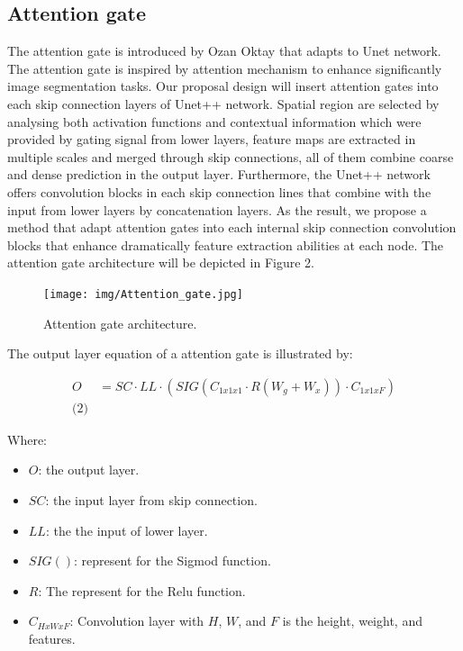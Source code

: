 \documentclass[journal]{IEEEtran} %
\begin{document}
\subsection{Attention gate}
The attention gate is introduced by Ozan Oktay \cite{b3} that adapts to Unet network. The attention gate is inspired by attention mechanism \cite{b4} to enhance significantly image segmentation tasks. Our proposal design will insert attention gates into each skip connection layers of Unet++ network. Spatial region are selected by analysing both activation functions and contextual information which were provided by gating signal from lower layers, feature maps are extracted in multiple scales and merged through skip connections, all of them combine coarse and dense prediction in the output layer. Furthermore, the Unet++ network offers convolution blocks in each skip connection lines that combine with the input from lower layers by concatenation layers. As the result, we propose a method that adapt attention gates into each internal skip connection convolution blocks that enhance dramatically feature extraction abilities at each node. The attention gate architecture will be depicted in Figure 2.

\begin{figure}[H]
    \centering
    \texttt{[image: img/Attention\_gate.jpg]}
    \caption{Attention gate architecture.}
    \label{fig}
\end{figure}

\indent
The output layer equation of a attention gate is illustrated by:

\[
\begin{aligned}
O &= SC \cdot LL \cdot (SIG(C_{1x1x1}\cdot R(W_{g} + W_{x})) \cdot C_{1x1xF})
\label{eq:AG_equation}
\\
\text{(2)}
\end{aligned}
\]

\indent
Where:
\begin{itemize}
    \item $O$: the output layer.
    \item $SC$: the input layer from skip connection.
    \item $LL$: the the input of lower layer.
    \item $SIG()$: represent for the Sigmod function.
    \item $R$: The represent for the Relu function.
    \item $C_{HxWxF}$: Convolution layer with $H$, $W$, and $F$ is the height, weight, and features.
\end{itemize}
\end{document}
